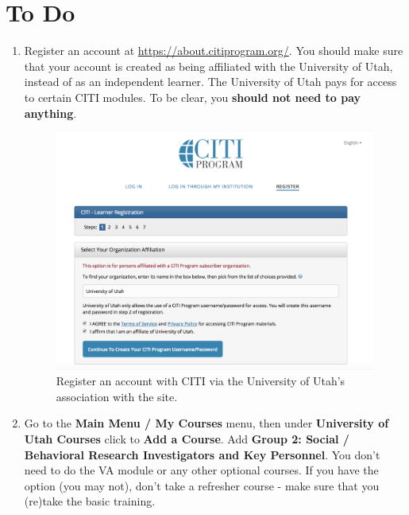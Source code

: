 \documentclass{article}
\begin{document}
\section{To Do}
\begin{enumerate}
    \item Register an account at \href{https://about.citiprogram.org/}{https://about.citiprogram.org/}. You should make sure that your account is created as being affiliated with the University of Utah, instead of as an independent learner. The University of Utah pays for access to certain CITI modules. To be clear, you \textbf{should not need to pay anything}.
    
    \begin{figure}[h!]
    \centering
    \includegraphics[scale=0.5]{CITI-registration-page}
    \caption{Register an account with CITI via the University of Utah's association with the site.}
    \end{figure}
    
    \item Go to the \textbf{Main Menu / My Courses} menu, then under \textbf{University of Utah Courses} click to \textbf{Add a Course}. Add  \textbf{Group 2: Social / Behavioral Research Investigators and Key Personnel}. You don't need to do the VA module or any other optional courses. If you have the option (you may not), don't take a refresher course - make sure that you (re)take the basic training.
    

\end{enumerate}
\end{document}
